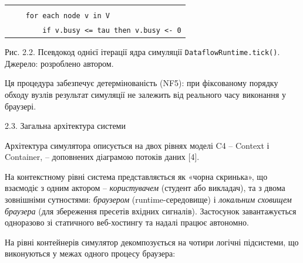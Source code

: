 \documentclass[
]{article}
\newcommand{\passthrough}[1]{#1}
\begin{document}
{\begin{longtable}[]{@{}
  >{\raggedright\arraybackslash}p{}@{}}
\begin{minipage}[t]{\linewidth}
\passthrough{\lstinline!            !}\passthrough{\lstinline!fires!}\passthrough{\lstinline! !}\passthrough{\lstinline!<-!}\passthrough{\lstinline! !}\passthrough{\lstinline!fires!}\passthrough{\lstinline! !}\passthrough{\lstinline!+!}\passthrough{\lstinline! !}\passthrough{\lstinline!1!}\strut \\
\passthrough{\lstinline!    !}\passthrough{\lstinline!for!}\passthrough{\lstinline! !}\passthrough{\lstinline!each!}\passthrough{\lstinline! !}\passthrough{\lstinline!node!}\passthrough{\lstinline! !}\passthrough{\lstinline!v!}\passthrough{\lstinline! !}\passthrough{\lstinline!in!}\passthrough{\lstinline! !}\passthrough{\lstinline!V!}\strut \\
\passthrough{\lstinline!        !}\passthrough{\lstinline!if!}\passthrough{\lstinline! !}\passthrough{\lstinline!v.busy!}\passthrough{\lstinline! !}\passthrough{\lstinline!<=!}\passthrough{\lstinline! !}\passthrough{\lstinline!tau!}\passthrough{\lstinline! !}\passthrough{\lstinline!then!}\passthrough{\lstinline! !}\passthrough{\lstinline!v.busy!}\passthrough{\lstinline! !}\passthrough{\lstinline!<-!}\passthrough{\lstinline! !}\passthrough{\lstinline!0!}\strut
\end{minipage} \\
\end{longtable}
}

Рис. 2.2. Псевдокод однієї ітерації ядра симуляції
\passthrough{\lstinline!DataflowRuntime!}\passthrough{\lstinline!.!}\passthrough{\lstinline!tick!}\passthrough{\lstinline!()!}.
Джерело: розроблено автором.

Ця процедура забезпечує детермінованість (NF5): при фіксованому порядку
обходу вузлів результат симуляції не залежить від реального часу
виконання у браузері.

\protect{}\label{X8971522f2fc6036ff7f6d6d494a0986f56fee46}{}2.3.
Загальна архітектура системи

Архітектура симулятора описується на двох рівнях моделі C4 -- Context і
Container, -- доповнених діаграмою потоків даних {[}4{]}.

На контекстному рівні система представляється як «чорна скринька», що
взаємодіє з одним актором -- \emph{користувачем} (студент або викладач),
та з двома зовнішніми сутностями: \emph{браузером} (runtime-середовище)
і \emph{локальним сховищем браузера} (для збереження пресетів вхідних
сигналів). Застосунок завантажується одноразово зі статичного
веб-хостингу та надалі працює автономно.

На рівні контейнерів симулятор декомпозується на чотири логічні
підсистеми, що виконуються у межах одного процесу браузера:
\end{document}
